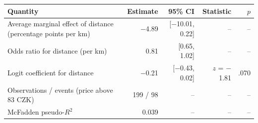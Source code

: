 \begin{tabular}{p{6cm}rrrr}
  \toprule
Quantity & Estimate & 95\% CI & Statistic & $p$ \\ 
  \midrule
Average marginal effect of distance (percentage points per km) & $-$4.89 & [$-$10.01, 0.22] & -- & -- \\ 
  Odds ratio for distance (per km) & 0.81 & [0.65, 1.02] & -- & -- \\ 
  Logit coefficient for distance & $-$0.21 & [$-$0.43, 0.02] & $z$ = $-$1.81 & .070 \\ 
  Observations / events (price above 83 CZK) & 199 / 98 & -- & -- & -- \\ 
  McFadden pseudo-$R^2$ & 0.039 & -- & -- & -- \\ 
   \bottomrule
\end{tabular}
